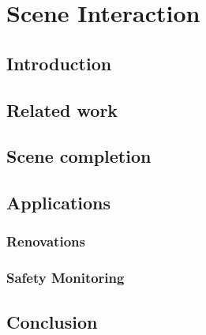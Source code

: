 
\chapter{Scene Interaction} \label{ch:9_Scene_Interaction}

\section{Introduction}

\section{Related work}

\section{Scene completion}

\section{Applications}

\subsection{Renovations}

\subsection{Safety Monitoring}

\section{Conclusion}

\cleardoublepage

